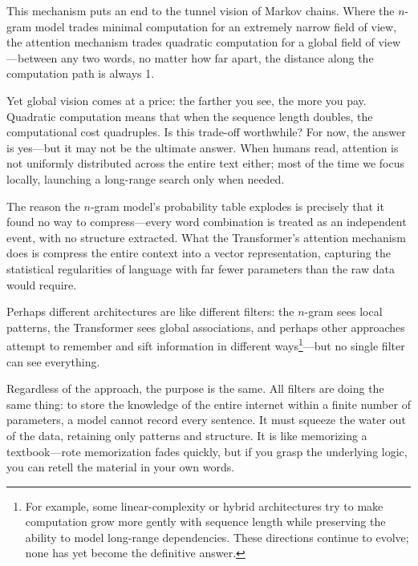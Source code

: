 

\newpage
This mechanism puts an end to the tunnel vision of Markov chains. Where the $n$-gram model trades minimal computation for an extremely narrow field of view, the attention mechanism trades quadratic computation for a global field of view---between any two words, no matter how far apart, the distance along the computation path is always 1.

\vspace{1em}

Yet global vision comes at a price: the farther you see, the more you pay. Quadratic computation means that when the sequence length doubles, the computational cost quadruples. Is this trade-off worthwhile? For now, the answer is yes---but it may not be the ultimate answer. When humans read, attention is not uniformly distributed across the entire text either; most of the time we focus locally, launching a long-range search only when needed.

\vspace{1em}

The reason the $n$-gram model's probability table explodes is precisely that it found no way to compress---every word combination is treated as an independent event, with no structure extracted.
What the Transformer's attention mechanism does is compress the entire context into a vector representation, capturing the statistical regularities of language with far fewer parameters than the raw data would require.

\vspace{1em}

Perhaps different architectures are like different filters: the $n$-gram sees local patterns, the Transformer sees global associations, and perhaps other approaches attempt to remember and sift information in different ways\footnote{For example, some linear-complexity or hybrid architectures try to make computation grow more gently with sequence length while preserving the ability to model long-range dependencies. These directions continue to evolve; none has yet become the definitive answer.}---but no single filter can see everything.

\vspace{1em}

Regardless of the approach, the purpose is the same. All filters are doing the same thing: to store the knowledge of the entire internet within a finite number of parameters, a model cannot record every sentence. It must squeeze the water out of the data, retaining only patterns and structure. It is like memorizing a textbook---rote memorization fades quickly, but if you grasp the underlying logic, you can retell the material in your own words.

